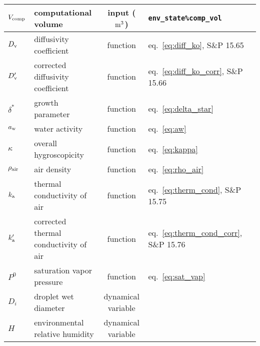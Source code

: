 \documentclass{article}
\begin{document}
\begin{tabular}{lp{4cm}clp{3cm}}
$V_{\rm comp}$ & computational volume & input ($\rm m^3$) & \verb+env_state%comp_vol+\\
\hline
$D_{\rm v}$     & diffusivity coefficient   &  function &eq.~\ref{eq:diff_ko}, S\&P 15.65  \\
$D_{\rm v}'$     & corrected diffusivity coefficient   &  function & eq.~\ref{eq:diff_ko_corr}, S\&P 15.66  \\
$\delta^*$  & growth parameter & function & eq.~\ref{eq:delta_star}\\
$a_{\rm w}$  & water activity  & function & eq.~\ref{eq:aw}   \\
$\kappa$      &  overall hygroscopicity   &  function &  eq.~\ref{eq:kappa}  \\
$ \rho_{\rm air}$    &  air density   &  function &  eq.~\ref{eq:rho_air}  \\
$k_{\rm a} $     & thermal conductivity of air    &  function&  eq.~\ref{eq:therm_cond}, S\&P 15.75   \\
$k_{\rm a}' $    & corrected thermal conductivity of air    &  function &  eq.~\ref{eq:therm_cond_corr}, S\&P 15.76   \\
$P^0$   & saturation vapor pressure &  function & eq.~\ref{eq:sat_vap}  \\
$D_i$     &  droplet wet diameter  & dynamical variable  &     \\
$H$     &  environmental relative humidity  &  dynamical variable &  \\

\hline 
\end{tabular}
\end{document}
